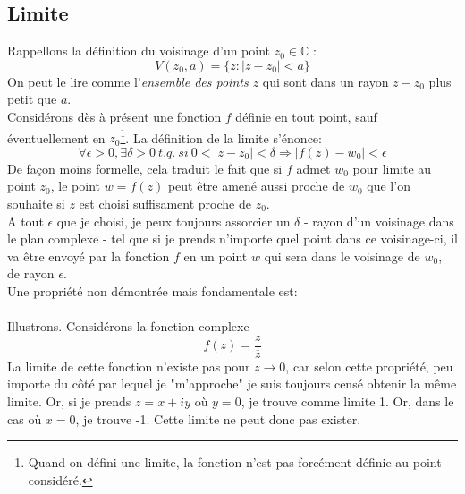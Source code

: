     
\subsection{Limite}
Rappellons la définition du voisinage d'un point $z_0\in\mathbb{C}$ :
\begin{equation}
	V(z_0,a) = \{z : |z-z_0| < a\}
\end{equation}
On peut le lire comme l'\textit{ensemble des points $z$} qui sont dans un rayon $z-z_0$
plus petit que $a$.\\
    
Considérons dès à présent une fonction $f$ définie en tout point, sauf éventuellement en 
$z_0$\footnote{Quand on défini une limite, la fonction n'est pas forcément définie au point
considéré.}. La définition de la limite s'énonce:
\begin{equation}
	\forall \epsilon > 0, \exists \delta >0\ t.q.\ si\ 0 < |z-z_0| < \delta \Rightarrow |f(z)-w_0|
	< \epsilon
\end{equation}
De façon moins formelle, cela traduit le fait que si $f$ admet $w_0$ pour limite au point $z_0$,
le point $w=f(z)$ peut être amené aussi proche de $w_0$ que l'on souhaite si $z$ est choisi 
suffisament proche de $z_0$.\\
A tout $\epsilon$ que je choisi, je peux toujours assorcier un $\delta$ - rayon d'un voisinage 
dans le plan complexe - tel que si je prends n'importe quel point dans ce voisinage-ci, il va 
être envoyé par la fonction $f$ en un point $w$ qui sera dans le voisinage de $w_0$, de rayon
$\epsilon$.\\
Une propriété non démontrée mais fondamentale est:\\
    
\ \\
Illustrons. Considérons la fonction complexe 
\begin{equation}
	f(z) = \frac{z}{\overline{z}}
\end{equation}
La limite de cette fonction n'existe pas pour $z \rightarrow 0$, car selon cette propriété, peu
importe du côté par lequel je "m'approche" je suis toujours censé obtenir la même limite. Or, si
je prends $z = x+iy$ où $y=0$, je trouve comme limite 1. Or, dans le cas où $x=0$, je trouve -1.
Cette limite ne peut donc pas exister.\\
    
    
    
